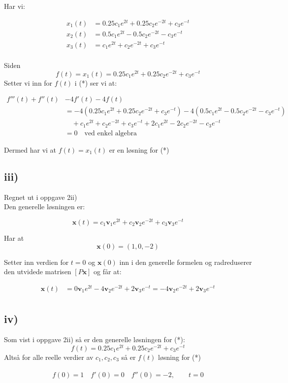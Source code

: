 \documentclass[a4paper, norsk, twoside, 10pt]{article}
\begin{document}
\begin{flushleft}
  Har vi:

  \begin{align*}
    x_{1}(t) &= 0.25c_{1}e^{2t} + 0.25c_{2}e^{-2t} + c_{3}e^{-t} \\
    x_{2}(t) &= 0.5c_{1}e^{2t} - 0.5c_{2}e^{-2t} - c_{3}e^{-t} \\
    x_{3}(t) &=c_{1}e^{2t} + c_{2}e^{-2t} + c_{3}e^{-t} \\
  \end{align*}

  Siden \[f(t) = x_{1}(t)  =0.25c_{1}e^{2t} + 0.25c_{2}e^{-2t} + c_{3}e^{-t}  \]
  Setter vi inn for $f(t)$ i (*) ser vi at:

  \begin{align*}
    f'''(t) +f''(t) &-4f'(t) -4f(t) \\&= -4(0.25c_{1}e^{2t} + 0.25c_{2}e^{-2t} + c_{3}e^{-t}) -4(0.5c_{1}e^{2t} - 0.5c_{2}e^{-2t} - c_{3}e^{-t} )\\ &\quad+ c_{1}e^{2t} + c_{2}e^{-2t} + c_{3}e^{-t} + 2c_{1}e^{2t}  -2c_{2}e^{-2t} - c_{3}e^{-t} \\
    &= 0 \quad \text{ved enkel algebra}
  \end{align*}

  Dermed har vi at $f(t) = x_{1}(t)$ er en løsning for (*)


  \subsection*{iii)}

  Regnet ut i oppgave 2ii)\\ Den generelle løsningen er:

  \[\mathbf{x}(t) = c_{1}\mathbf{v}_{1}e^{2t} + c_{2}\mathbf{v}_{2}e^{-2t} + c_{3}\mathbf{v}_{3}e^{-t} \]


  Har at \[\mathbf{x}(0) = (1 , 0 , -2)\]

  Setter inn verdien for $t = 0$ og $\mathbf{x}(0)$ inn i den generelle formelen og radreduserer den utvidede matrisen $[P \mathbf{x}]$ og får at:

  \begin{align*}
    \mathbf{x}(t) &= 0\mathbf{v}_{1}e^{2t} -4\mathbf{v}_{2}e^{-2t} + 2\mathbf{v}_{3}e^{-t}  = -4\mathbf{v}_{2}e^{-2t}  + 2\mathbf{v}_{3}e^{-t} \\
  \end{align*}




  \subsection*{iv)}
  Som vist i oppgave 2ii) så er den generelle løsningen for (*):
  \[f(t) = 0.25c_{1}e^{2t} + 0.25c_{2}e^{-2t} + c_{3}e^{-t} \]
  Altså for alle reelle verdier av $c_{1}, c_{2}, c_{3}$ så er $f(t)$ løsning for (*)
  \\
  \ \\
  \[f(0) = 1 \quad f'(0) = 0 \quad f''(0) = -2, \qquad t = 0\]


\end{flushleft}
\end{document}
